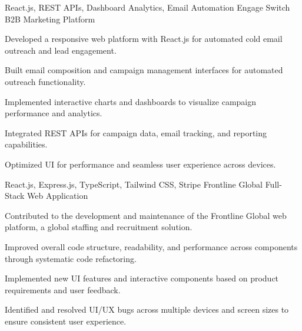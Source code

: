 \newpage
{}


\begin{cventries}

  \cventry
    {React.js, REST APIs, Dashboard Analytics, Email Automation} %
    {Engage Switch} %
    {B2B Marketing Platform} %
    {}
    {
      \begin{cvitems} %
        \item {Developed a responsive web platform with React.js for automated cold email outreach and lead engagement.}
        \item {Built email composition and campaign management interfaces for automated outreach functionality.}
        \item {Implemented interactive charts and dashboards to visualize campaign performance and analytics.}
        \item {Integrated REST APIs for campaign data, email tracking, and reporting capabilities.}
        \item {Optimized UI for performance and seamless user experience across devices.}
      \end{cvitems}
    }

  \cventry
    {React.js, Express.js, TypeScript, Tailwind CSS, Stripe} %
    {Frontline Global} %
    {Full-Stack Web Application}
    {}
    {
      \begin{cvitems} %
        \item {Contributed to the development and maintenance of the Frontline Global web platform, a global staffing and recruitment solution.}
        \item {Improved overall code structure, readability, and performance across components through systematic code refactoring.}
        \item {Implemented new UI features and interactive components based on product requirements and user feedback.}
        \item {Identified and resolved UI/UX bugs across multiple devices and screen sizes to ensure consistent user experience.}
      \end{cvitems}
    }


\end{cventries}
